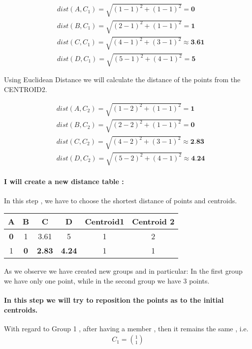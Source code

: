\documentclass[12pt]{article}
\begin{document}
\begin{align*}
    &dist(A, C_{1}) = \sqrt{(1-1)^2 +(1-1)^2} = \textbf{0}\\
    &dist(B, C_{1}) = \sqrt{(2-1)^2 + (1-1)^2}=\textbf{1}\\
    & dist(C, C_{1}) = \sqrt{(4-1)^2 + (3-1)^2} \approx \textbf{3.61}\\
    & dist(D, C_{1}) = \sqrt{(5-1)^2 + (4-1)^2} = \textbf{5}
\end{align*}

Using Euclidean Distance we will calculate the distance of the points from the CENTROID2.

\begin{align*}
    &dist(A, C_{2}) = \sqrt{(1-2)^2 +(1-1)^2} = \textbf{1}\\
    &dist(B, C_{2}) = \sqrt{(2-2)^2 + (1-1)^2}=\textbf{0}\\
    & dist(C, C_{2}) = \sqrt{(4-2)^2 + (3-1)^2} \approx \textbf{2.83}\\
    & dist(D, C_{2}) = \sqrt{(5-2)^2 + (4-1)^2} \approx \textbf{4.24}
\end{align*}

\paragraph{I will create a new distance table :}


In this step , we have to choose the shortest distance of points and centroids.
\begin{center}
 \begin{tabular}{||c c c c c c||} 
 \hline
 A & B & C & D & Centroid1 & Centroid 2\\ [0.5ex] 
 \hline\hline
 \textbf{0} & 1 & 3.61 & 5 & 1 & 2\\ 
 \hline
 1 & \textbf{0} & \textbf{2.83} & \textbf{4.24} & 1 & 1\\
 \hline
\end{tabular}
\end{center}

As we observe we have created new groups and in particular: In the first group we have only one point, while in the second group we have 3 points.

\paragraph{In this step we will try to reposition the points as to the initial centroids.}
\newline
With regard to Group 1 , after having a member , then it remains the same , i.e.
\begin{align*}
    C_{1} = \binom{1}{1}
\end{align*}
\end{document}
